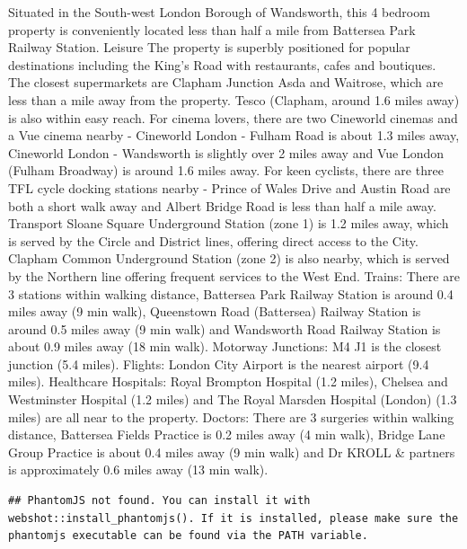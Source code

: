 \documentclass[]{article}
\begin{document}
Situated in the South-west London Borough of Wandsworth, this 4 bedroom
property is conveniently located less than half a mile from Battersea
Park Railway Station. Leisure The property is superbly positioned for
popular destinations including the King's Road with restaurants, cafes
and boutiques. The closest supermarkets are Clapham Junction Asda and
Waitrose, which are less than a mile away from the property. Tesco
(Clapham, around 1.6 miles away) is also within easy reach. For cinema
lovers, there are two Cineworld cinemas and a Vue cinema nearby -
Cineworld London - Fulham Road is about 1.3 miles away, Cineworld London
- Wandsworth is slightly over 2 miles away and Vue London (Fulham
Broadway) is around 1.6 miles away. For keen cyclists, there are three
TFL cycle docking stations nearby - Prince of Wales Drive and Austin
Road are both a short walk away and Albert Bridge Road is less than half
a mile away. Transport Sloane Square Underground Station (zone 1) is 1.2
miles away, which is served by the Circle and District lines, offering
direct access to the City. Clapham Common Underground Station (zone 2)
is also nearby, which is served by the Northern line offering frequent
services to the West End. Trains: There are 3 stations within walking
distance, Battersea Park Railway Station is around 0.4 miles away (9 min
walk), Queenstown Road (Battersea) Railway Station is around 0.5 miles
away (9 min walk) and Wandsworth Road Railway Station is about 0.9 miles
away (18 min walk). Motorway Junctions: M4 J1 is the closest junction
(5.4 miles). Flights: London City Airport is the nearest airport (9.4
miles). Healthcare Hospitals: Royal Brompton Hospital (1.2 miles),
Chelsea and Westminster Hospital (1.2 miles) and The Royal Marsden
Hospital (London) (1.3 miles) are all near to the property. Doctors:
There are 3 surgeries within walking distance, Battersea Fields Practice
is 0.2 miles away (4 min walk), Bridge Lane Group Practice is about 0.4
miles away (9 min walk) and Dr KROLL \& partners is approximately 0.6
miles away (13 min walk).

\begin{verbatim}
## PhantomJS not found. You can install it with webshot::install_phantomjs(). If it is installed, please make sure the phantomjs executable can be found via the PATH variable.
\end{verbatim}

\hypertarget{htmlwidget-9e6654fc13db2253916b}{}
\end{document}
